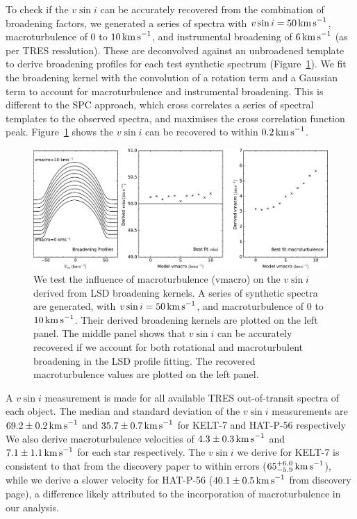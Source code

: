 \documentclass[useAMS,usenatbib]{mn2e}
\begin{document}
To check if the $v\sin i$ can be accurately recovered from the combination of broadening factors, we generated a series of spectra with $v\sin i=50\,\text{km\,s}^{-1}$, macroturbulence of 0 to $10\,\text{km\,s}^{-1}$, and instrumental broadening of $6\,\text{km\,s}^{-1}$ (as per TRES resolution). These are deconvolved against an unbroadened template to derive broadening profiles for each test synthetic spectrum (Figure~\ref{fig:vmacro}). We fit the broadening kernel with the convolution of a rotation term \citep[modelled analytically from][]{2005oasp.book.....G} and a Gaussian term to account for macroturbulence \citep[expected for F-stars at $6500\,\text{K}$ to be $\sim 6\,\text{km\,s}^{-1}$][]{2014MNRAS.444.3592D} and instrumental broadening. This is different to the SPC approach, which cross correlates a series of spectral templates to the observed spectra, and maximises the cross correlation function peak. Figure~\ref{fig:vmacro} shows the $v\sin i$ can be recovered to within $0.2\,\text{km\,s}^{-1}$. 

\begin{figure}
  \includegraphics[width=12cm]{plots/vmacro.eps}
  \caption{\label{fig:vmacro} We test the influence of macroturbulence (vmacro) on the $v\sin i$ derived from LSD broadening kernels. A series of synthetic spectra are generated, with $v\sin i=50\,\text{km\,s}^{-1}$, and macroturbulence of 0 to $10\,\text{km\,s}^{-1}$. Their derived broadening kernels are plotted on the left panel. The middle panel shows that $v\sin i$ can be accurately recovered if we account for both rotational and macroturbulent broadening in the LSD profile fitting. The recovered macroturbulence values are plotted on the left panel.}
\end{figure}

A $v\sin i$ measurement is made for all available TRES out-of-transit spectra of each object. The median and standard deviation of the $v\sin i$ measurements are $69.2\pm0.2\,\text{km\,s}^{-1}$ and $35.7\pm0.7\,\text{km\,s}^{-1}$ for KELT-7 and HAT-P-56 respectively  We also derive macroturbulence velocities of $4.3\pm0.3\,\text{km\,s}^{-1}$ and $7.1\pm1.1\,\text{km\,s}^{-1}$ for each star respectively. The $v\sin i$ we derive for KELT-7 is consistent to that from the discovery paper to within errors ($65_{-5.9}^{+6.0}\,\text{km\,s}^{-1}$), while we derive a slower velocity for HAT-P-56 ($40.1\pm0.5\,\text{km\,s}^{-1}$ from discovery page), a difference likely attributed to the incorporation of macroturbulence in our analysis.   
\end{document}
